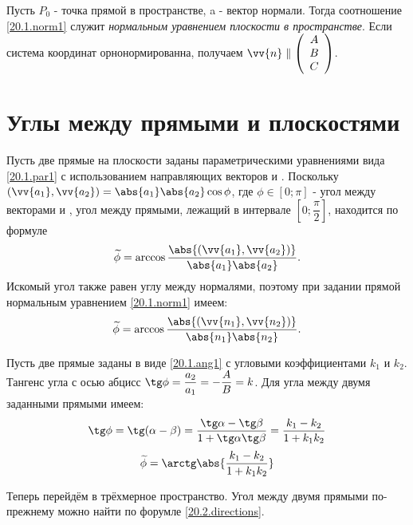   Пусть $P_0$ - точка прямой в пространстве, a  - вектор нормали. Тогда соотношение \ref{20.1.norm1} служит \textit{нормальным уравнением плоскости в пространстве}. Если система координат орнонормированна, получаем $\vv{n}\parallel\left(\begin{array}{crl}
A\\
B\\
C\\
\end{array}\right)$.

\section{Углы между прямыми и плоскостями}

  Пусть две прямые на плоскости заданы параметрическими уравнениями вида \ref{20.1.par1} с использованием направляющих векторов  и . Поскольку $(\vv{a_1},\vv{a_2})=\abs{a_1}\abs{a_2}\cos \phi$, где $\phi \in \left[0;\pi\right]$ - угол между векторами  и , угол между прямыми, лежащий в интервале $\left[0;\dfrac \pi 2\right]$, находится по формуле
  \begin{equation}\label{20.2.directions}
  \widetilde\phi=\arccos\dfrac{\abs{(\vv{a_1},\vv{a_2})}}{\abs{a_1}\abs{a_2}}.
  \end{equation}
  Искомый угол также равен углу между нормалями, поэтому при задании прямой нормальным уравнением \ref{20.1.norm1} имеем:
  \begin{equation}\label{20.2.normals}
  \widetilde\phi=\arccos\dfrac{\abs{(\vv{n_1},\vv{n_2})}}{\abs{n_1}\abs{n_2}}.
  \end{equation}
  
  Пусть две прямые заданы в виде \ref{20.1.ang1} с угловыми коэффициентами $k_1$ и $k_2$. Тангенс угла с осью абцисс $\tg \phi = \dfrac{a_2}{a_1}=-\dfrac{A}{B}=k$. Для угла между двумя заданными прямыми имеем:
  \begin{equation}
  \tg \phi=\tg (\alpha-\beta)=\dfrac{\tg \alpha - \tg \beta}{1+\tg \alpha \tg \beta}=\dfrac{k_1-k_2}{1+k_1k_2}
  \end{equation}
  \begin{equation}\label{20.2.angles}
  \widetilde \phi = \arctg \abs{\dfrac{k_1-k_2}{1+k_1k_2}}
  \end{equation}
  
  Теперь перейдём в трёхмерное пространство. Угол между двумя прямыми по-прежнему можно найти по форумле \ref{20.2.directions}. 
  
